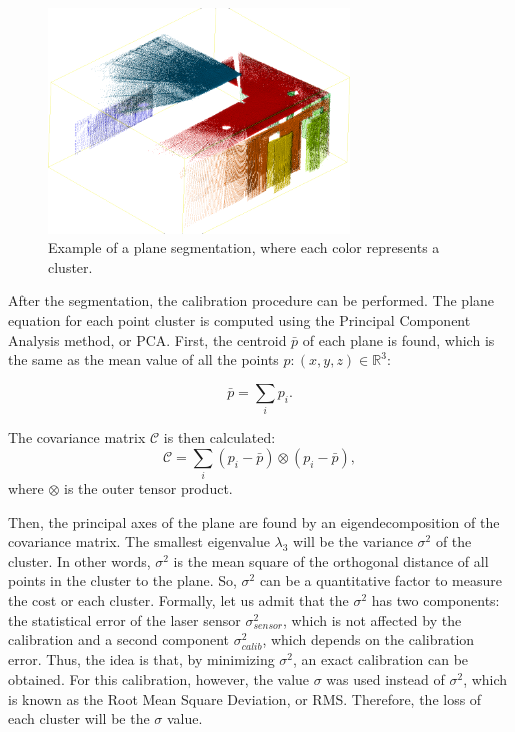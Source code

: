 \documentclass[conference]{IEEEtran}
\begin{document}
\begin{figure}[h]
    \centering
    \includegraphics[width=8cm]{images/segmented-pointcloud}
    \caption{Example of a plane segmentation, where each color represents a cluster.}
    \label{figure:cluster-segmentation-1}
\end{figure}

After the segmentation, the calibration procedure can be performed. The plane equation for each point cluster is computed using the Principal Component Analysis method, or PCA. First, the centroid $\bar{p}$ of each plane is found, which is the same as the mean value of all the points $p: (x, y, z) \in \mathds{R}^3$:

\begin{equation}
    \bar{p} = \sum_{i}{p_i}.
        \label{eqn:centroid-plane}
\end{equation}

The covariance matrix $\mathcal{C}$ is then calculated:
%
\begin{equation}
    \mathcal{C} = \sum_{i}{(p_i - \bar{p}) \otimes (p_i - \bar{p})},
        \label{eqn:covariance-matrix}
\end{equation}
%
\noindent where $\otimes$ is the outer tensor product.

Then, the principal axes of the plane are found by an eigendecomposition of the covariance matrix. The smallest eigenvalue $\lambda_3$ will be the variance $\sigma^2$ of the cluster. In other words, $\sigma^2$ is the mean square of the orthogonal distance of all points in the cluster to the plane. So, $\sigma^2$ can be a quantitative factor to measure the cost or each cluster. Formally, let us admit that the $\sigma^2$ has two components: the statistical error of the laser sensor $\sigma^2_{sensor}$, which is not affected by the calibration and a second component $\sigma^2_{calib}$, which depends on the calibration error. Thus, the idea is that, by minimizing $\sigma^2$, an exact calibration can be obtained. For this calibration, however, the value $\sigma$ was used instead of $\sigma^2$, which is known as the Root Mean Square Deviation, or RMS. Therefore, the loss of each cluster will be the $\sigma$ value.
\end{document}

